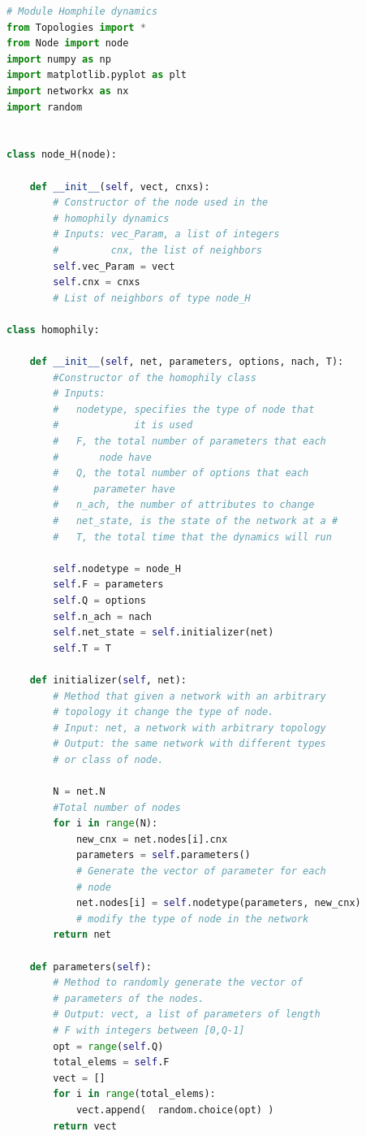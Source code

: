 \documentclass{article}
\begin{document}
\begin{lstlisting}[language=Python, caption= Homophily Class]
# Module Homphile dynamics
from Topologies import *
from Node import node
import numpy as np
import matplotlib.pyplot as plt
import networkx as nx
import random


class node_H(node):

    def __init__(self, vect, cnxs):
        # Constructor of the node used in the
        # homophily dynamics
        # Inputs: vec_Param, a list of integers
        #         cnx, the list of neighbors
        self.vec_Param = vect
        self.cnx = cnxs 
        # List of neighbors of type node_H

class homophily:

    def __init__(self, net, parameters, options, nach, T):
        #Constructor of the homophily class
        # Inputs: 
        #   nodetype, specifies the type of node that 
        #             it is used
        #   F, the total number of parameters that each
        #       node have
        #   Q, the total number of options that each
        #      parameter have
        #   n_ach, the number of attributes to change
        #   net_state, is the state of the network at a #              given time
        #   T, the total time that the dynamics will run

        self.nodetype = node_H
        self.F = parameters
        self.Q = options
        self.n_ach = nach
        self.net_state = self.initializer(net)
        self.T = T

    def initializer(self, net):
        # Method that given a network with an arbitrary
        # topology it change the type of node. 
        # Input: net, a network with arbitrary topology
        # Output: the same network with different types 
        # or class of node. 

        N = net.N 
        #Total number of nodes
        for i in range(N):
            new_cnx = net.nodes[i].cnx
            parameters = self.parameters()
            # Generate the vector of parameter for each
            # node
            net.nodes[i] = self.nodetype(parameters, new_cnx)
            # modify the type of node in the network
        return net

    def parameters(self):
        # Method to randomly generate the vector of 
        # parameters of the nodes. 
        # Output: vect, a list of parameters of length
        # F with integers between [0,Q-1]
        opt = range(self.Q)
        total_elems = self.F
        vect = []
        for i in range(total_elems):
            vect.append(  random.choice(opt) )
        return vect



\end{lstlisting}
\end{document}
